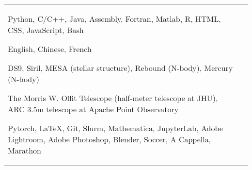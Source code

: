 \documentclass[10pt]{article} %
\begin{document}
\begin{tabular}{L{4cm}@{\hskip 0.3in}L{13cm}} %

	
	
	
	{Python, C/C++, Java, Assembly, Fortran, Matlab, R, HTML, CSS, JavaScript, Bash} %
	{} %
	{} %
	{}
 {}
	
	{English, Chinese, French} %
	{} %
	{} %
	{} %
	{}
	
	{DS9, Siril, MESA (stellar structure), Rebound (N-body), Mercury (N-body)} %
	{} %
	{} %
	{} %
	{}
	

	{The Morris W. Offit Telescope (half-meter telescope at JHU), ARC 3.5m telescope at Apache Point Observatory} %
	{} %
	{} %
	{} %
	{}
	
	
	
	{Pytorch, \LaTeX, Git, Slurm, Mathematica, JupyterLab, Adobe Lightroom, Adobe Photoshop, Blender, Soccer, A Cappella, Marathon} %
	{} %
	{} %
	{} %
	{}
\end{tabular}
\end{document}
